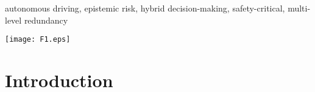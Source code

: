\documentclass[preprint,12pt,authoryear]{elsarticle}
\begin{document}
\begin{frontmatter}
\begin{abstract}
\end{abstract}

\begin{keyword}
autonomous driving, epistemic risk, hybrid decision-making, safety-critical, multi-level redundancy
\end{keyword}

\begin{graphicalabstract}
\texttt{[image: F1.eps]}
\end{graphicalabstract}

\begin{highlights}





\end{highlights}

\end{frontmatter}

\section{Introduction}
\label{Section1}
\end{document}
